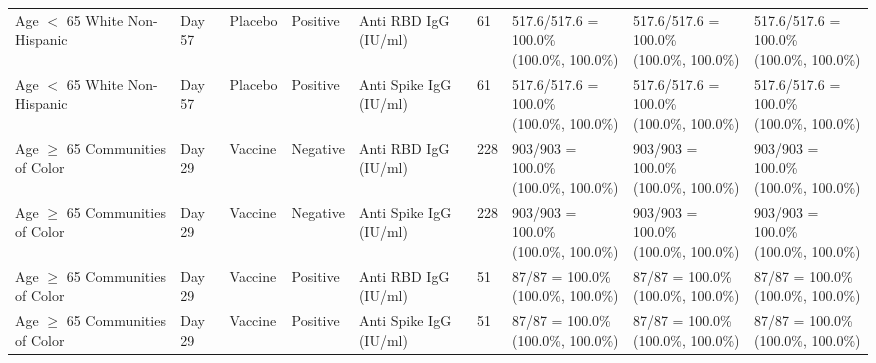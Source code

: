 \documentclass[]{book}
\theoremstyle{definition}
\theoremstyle{definition}
\theoremstyle{definition}
\newcommand{\1}{\mathbbm{1}}
\begin{document}
\begin{landscape}
\begin{ThreePartTable}
\begin{longtable}[t]{>{\raggedright\arraybackslash}p{2.7cm}llllllll}
\hspace{1em}Age $<$ 65 White Non-Hispanic & Day 57 & Placebo & Positive & Anti RBD IgG (IU/ml) & 61 & \makecell[l]{517.6/517.6 = 100.0\%\\(100.0\%, 100.0\%)} & \makecell[l]{517.6/517.6 = 100.0\%\\(100.0\%, 100.0\%)} & \makecell[l]{517.6/517.6 = 100.0\%\\(100.0\%, 100.0\%)}\\
\hspace{1em}Age $<$ 65 White Non-Hispanic & Day 57 & Placebo & Positive & Anti Spike IgG (IU/ml) & 61 & \makecell[l]{517.6/517.6 = 100.0\%\\(100.0\%, 100.0\%)} & \makecell[l]{517.6/517.6 = 100.0\%\\(100.0\%, 100.0\%)} & \makecell[l]{517.6/517.6 = 100.0\%\\(100.0\%, 100.0\%)}\\
\hspace{1em}Age $\geq$ 65 Communities of Color & Day 29 & Vaccine & Negative & Anti RBD IgG (IU/ml) & 228 & \makecell[l]{903/903 = 100.0\%\\(100.0\%, 100.0\%)} & \makecell[l]{903/903 = 100.0\%\\(100.0\%, 100.0\%)} & \makecell[l]{903/903 = 100.0\%\\(100.0\%, 100.0\%)}\\
\hspace{1em}Age $\geq$ 65 Communities of Color & Day 29 & Vaccine & Negative & Anti Spike IgG (IU/ml) & 228 & \makecell[l]{903/903 = 100.0\%\\(100.0\%, 100.0\%)} & \makecell[l]{903/903 = 100.0\%\\(100.0\%, 100.0\%)} & \makecell[l]{903/903 = 100.0\%\\(100.0\%, 100.0\%)}\\
\hspace{1em}Age $\geq$ 65 Communities of Color & Day 29 & Vaccine & Positive & Anti RBD IgG (IU/ml) & 51 & \makecell[l]{87/87 = 100.0\%\\(100.0\%, 100.0\%)} & \makecell[l]{87/87 = 100.0\%\\(100.0\%, 100.0\%)} & \makecell[l]{87/87 = 100.0\%\\(100.0\%, 100.0\%)}\\
\hspace{1em}Age $\geq$ 65 Communities of Color & Day 29 & Vaccine & Positive & Anti Spike IgG (IU/ml) & 51 & \makecell[l]{87/87 = 100.0\%\\(100.0\%, 100.0\%)} & \makecell[l]{87/87 = 100.0\%\\(100.0\%, 100.0\%)} & \makecell[l]{87/87 = 100.0\%\\(100.0\%, 100.0\%)}\\

\end{longtable}
\end{ThreePartTable}
\end{landscape}
\end{document}
